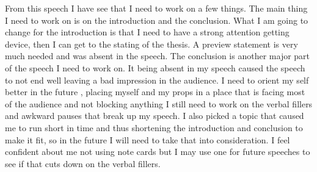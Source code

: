 \documentclass[12pt,letterpaper]{article}
\begin{document}
\par{From this speech I have see that I need to work on a few things. The main thing I need to work on is on the introduction and the conclusion. What I am going to change for the introduction is that I need to have a strong attention getting device, then I can get to the stating of the thesis. A preview statement is very much needed and was absent in the speech. The conclusion is another major part of the speech I need to work on. It being absent in my speech caused the speech to not end well leaving a bad impression in the audience. I need to orient my self better in the future , placing myself and my props in a place that is facing most of the audience and not blocking anything  I still need to work on the verbal fillers and awkward pauses that break up my speech. I also picked a topic that caused me to run short in time and thus shortening the introduction and conclusion to make it fit, so in the future I will need to take that into consideration. I feel confident about me not using note cards but I may use one for future speeches to see if that cuts down on the verbal fillers. }
\end{document}

